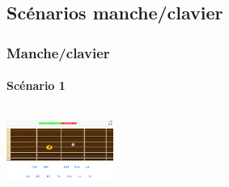 \documentclass{beamer}
\begin{document}
	\subsection{Scénarios manche/clavier}

	\begin{frame}

   		\frametitle{Manche/clavier}

       		\framesubtitle{Scénario 1}

		\begin{columns}

			 \begin{column}{0.33\textwidth}

				\includegraphics[width=3.5cm]{images/clavier_question.png}

			\end{column}

			 \begin{column}{0.33\textwidth}

				
			\end{column}

			 \begin{column}{0.33\textwidth}

				
			\end{column}

		\end{columns} 

	\end{frame}
\end{document}
